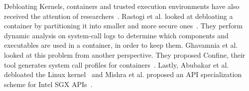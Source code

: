 Debloating Kernels, containers and trusted execution environments have also received the attention of researchers~\cite{abubakar2021shard,mishra2021sgxpecial}. 
Rastogi et al. looked at debloating a container by partitioning it into smaller and more secure ones~\cite{rastogi2017Cimplifier}. They perform dynamic analysis on system-call logs to determine which components and executables are used in a container, in order to keep them. 
Ghavamnia et al. looked at this problem from another perspective. 
They proposed Confine, their tool generates system call profiles for containers~\cite{259711}.
Lastly, Abubakar et al. debloated the Linux kernel~\cite{abubakar2021shard} and Mishra et al. proposed an API specialization scheme for Intel SGX APIs~\cite{mishra2021sgxpecial}.


